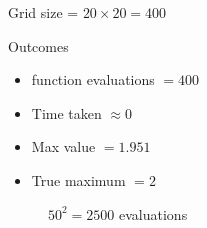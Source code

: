 \documentclass[
    xcolor={svgnames,dvipsnames},
    hyperref={colorlinks, citecolor=DeepPink4, linkcolor=DarkRed, urlcolor=DarkBlue}
    ]{beamer}  %
\newcommand{\1}{\mathbbm 1}
\begin{document}
\begin{frame}
    
    Grid size = $20 \times 20 = 400$

    \vspace{0.5em}
    Outcomes

    \begin{itemize}
        \item function evaluations $= 400$
    \vspace{0.5em}
        \item Time taken $\approx 0$
    \vspace{0.5em}
        \item Max value $= 1.951$
    \vspace{0.5em}
        \item True maximum $= 2$
    \end{itemize}

    \vspace{0.5em}
    \vspace{0.5em}
\end{frame}


\begin{frame}
    
    \begin{figure}
       \begin{center}
           \caption{$50^2 = 2500$ evaluations}
       \end{center}
    \end{figure}

\end{frame}
\end{document}
